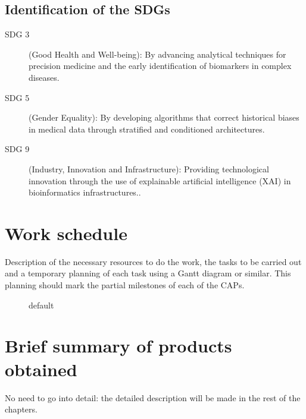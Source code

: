 \documentclass[ENG,BIB]{TFUOC}%
\begin{document}
\subsection{Identification of the SDGs}

\begin{description}
\item[SDG 3] 
(Good Health and Well-being): By advancing analytical techniques for precision medicine and the early identification of biomarkers in complex diseases.
\end{description}

\begin{description}
\item[SDG 5] 
(Gender Equality): By developing algorithms that correct historical biases in medical data through stratified and conditioned architectures.
\end{description}

\begin{description}
\item[SDG 9] 
(Industry, Innovation and Infrastructure): Providing technological innovation through the use of explainable artificial intelligence (XAI) in bioinformatics infrastructures..
\end{description}



\section{Work schedule}

Description of the necessary resources to do the work, the tasks to be carried out and a temporary planning of each task using a Gantt diagram or similar. This planning should mark the partial milestones of each of the CAPs.

\begin{figure}[htbp]
\begin{center}

\caption{default}
\label{default}
\end{center}
\end{figure}


\section{Brief summary of products obtained}

No need to go into detail: the detailed description will be made in the rest of the chapters.
\end{document}
